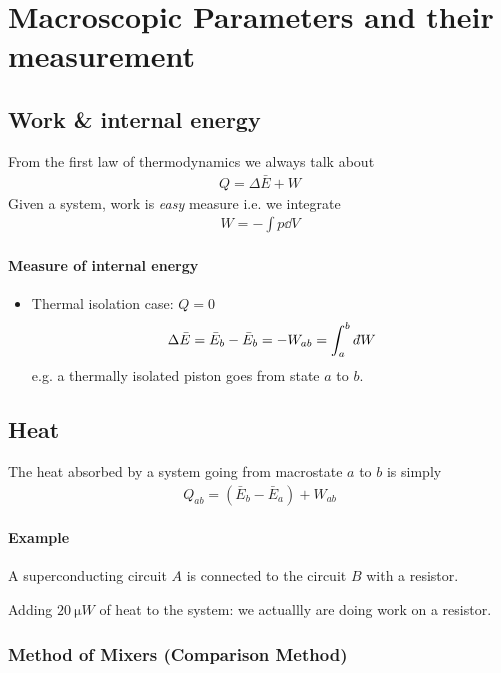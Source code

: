 \documentclass[../main.tex]{subfiles}
\begin{document}
\pagestyle{fancy}

\section{Macroscopic Parameters and their measurement}

\subsection{Work \& internal energy}
From the first law of thermodynamics we always talk about
\begin{align*}
    Q = \Delta \bar E + W
\end{align*}
Given a system, work is \textit{easy} measure i.e. we integrate
\begin{align*}
    W = -\int p \dd V
\end{align*}
\paragraph{Measure of internal energy}
\begin{itemize}
    \item Thermal isolation case: $Q = 0$
    \begin{align*}
        \Delta \bar E = \bar E_b - \bar E_b = -W_{ab} = \int_a^b d\hspace*{-0.08em}\bar{}\hspace*{0.1em} W
    \end{align*}
    e.g. a thermally isolated piston goes from state $a$ to $b$.
\end{itemize}

\subsection{Heat}

The heat absorbed by a system going from macrostate $a$ to $b$ is simply
\begin{align*}
    Q_{ab} = (\bar E_b - \bar E_a) + W_{ab}
\end{align*}
\paragraph{Example} A superconducting circuit $A$ is connected to the circuit $B$ with a resistor.

Adding $\qty{20}{\micro W}$ of heat to the system: we actuallly are doing work on a resistor.

\subsubsection*{Method of Mixers (Comparison Method)}
\end{document}
